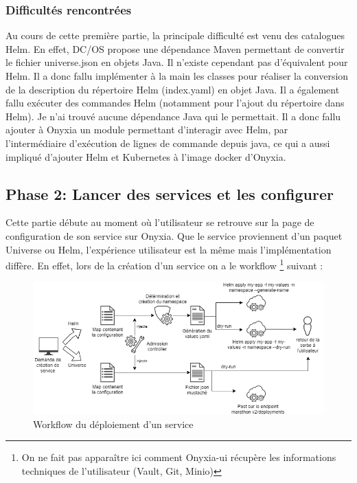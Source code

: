 \documentclass[11pt,fleqn]{book} %
\begin{document}
\subsubsection{Difficultés rencontrées}
Au cours de cette première partie, la principale difficulté est venu des catalogues Helm. En effet, DC/OS propose une dépendance Maven permettant de convertir le fichier universe.json en objets Java. Il n'existe cependant pas d'équivalent pour Helm. Il a donc fallu implémenter à la main les classes pour réaliser la conversion de la description du répertoire Helm (index.yaml) en objet Java. Il a également fallu exécuter des commandes Helm (notamment pour l'ajout du répertoire dans Helm). Je n'ai trouvé aucune dépendance Java qui le permettait. Il a donc fallu ajouter à Onyxia un module permettant d'interagir avec Helm, par l'intermédiaire d'exécution de lignes de commande depuis java, ce qui a aussi impliqué d'ajouter Helm et Kubernetes à l'image docker d'Onyxia.

\subsection{Phase 2: Lancer des services et les configurer}
Cette partie débute au moment où l'utilisateur se retrouve sur la page de configuration de son service sur Onyxia. Que le service proviennent d'un paquet Universe ou Helm, l'expérience utilisateur est la même mais l'implémentation diffère. En effet, lors de la création d'un service on a le workflow \footnote{On ne fait pas apparaître ici comment Onyxia-ui récupère les informations techniques de l'utilisateur (Vault, Git, Minio)} suivant : 
\begin{figure}[H]\centering
\renewcommand{\figurename}{Diagramme}
\includegraphics[scale=0.6]{Pictures/onyxia/publish-service.png}
\captionsetup{margin=1.5cm,format=hang,justification=justified}
\caption{Workflow du déploiement d'un service \newline}
\end{figure}
\end{document}
